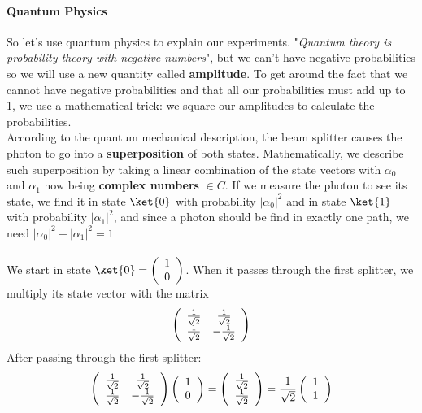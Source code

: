 \documentclass[10pt]{report}
\begin{document}
\paragraph{Quantum Physics} So let's use quantum physics to explain our experiments. "\textit{Quantum theory is probability theory with negative numbers}", but we can't have negative probabilities so we will use a new quantity called \textbf{amplitude}. To get around the fact that we cannot have negative probabilities and that all our probabilities must add up to 1, we use a mathematical trick: we square our amplitudes to calculate the probabilities.\\
According to the quantum mechanical description, the beam splitter causes the photon to go into a \textbf{superposition} of both states. Mathematically, we describe such superposition by taking a linear combination of the state vectors with $\alpha_0$ and $\alpha_1$ now being \textbf{complex numbers} $\in C$. If we measure the photon to see its state, we find it in state $\ket{0}$ with probability $|\alpha_0|^2$ and in state $\ket{1}$ with probability $|\alpha_1|^2$, and since a photon should be find in exactly one path, we need $|\alpha_0|^2+|\alpha_1|^2 = 1$\\\\
We start in state $\ket{0}=\left(\begin{array}{c}1\\0\end{array}\right)$. When it passes through the first splitter, we multiply its state vector with the matrix $$\left(\begin{array}{c c}
\frac{1}{\sqrt{2}}&\frac{1}{\sqrt{2}}\\\frac{1}{\sqrt{2}}&-\frac{1}{\sqrt{2}}
\end{array}\right)$$
After passing through the first splitter:
$$\left(\begin{array}{c c}
\frac{1}{\sqrt{2}}&\frac{1}{\sqrt{2}}\\\frac{1}{\sqrt{2}}&-\frac{1}{\sqrt{2}}
\end{array}\right)\left(\begin{array}{c}
1\\0
\end{array}\right) = \left(\begin{array}{c}
\frac{1}{\sqrt{2}}\\\frac{1}{\sqrt{2}}
\end{array}\right) = \frac{1}{\sqrt{2}}\left(\begin{array}{c}
1\\1
\end{array}\right)$$
\end{document}
